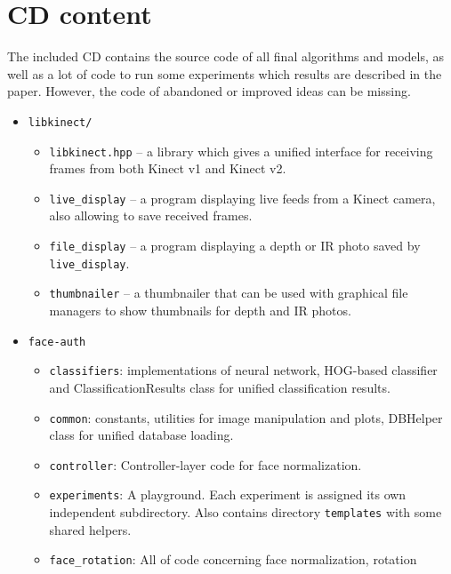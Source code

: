 \chapter{CD content}
    The included CD contains the source code of all final algorithms
    and models, as well as a lot of code to run some experiments
    which results are described in the paper.
    However, the code of abandoned or improved ideas can be missing.

    \begin{itemize}
        \item \texttt{libkinect/}
        \begin{itemize}
            \item \texttt{libkinect.hpp} -- a library which gives a unified interface
            for receiving frames from both Kinect v1 and Kinect v2.
            \item \texttt{live\_display} -- a program displaying live feeds from a Kinect
            camera, also allowing to save received frames.
            \item \texttt{file\_display} -- a program displaying a depth or IR photo saved
            by \texttt{live\_display}.
            \item \texttt{thumbnailer} -- a thumbnailer that can be used with graphical
            file managers to show thumbnails for depth and IR photos.
        \end{itemize}
        \item \texttt{face-auth}
            \begin{itemize}
                \item \texttt{classifiers}: implementations of neural network,
                      HOG-based classifier and ClassificationResults class for
                      unified classification results.
                \item \texttt{common}: constants, utilities for image manipulation and plots,
                      DBHelper class for unified database loading.
                \item \texttt{controller}: Controller-layer code for face normalization.
                \item \texttt{experiments}: A playground. Each experiment is assigned its
                      own independent subdirectory. Also contains directory \texttt{templates}
                      with some shared helpers.
                \item \texttt{face\_rotation}: All of code concerning face normalization, rotation

\end{itemize}
\end{itemize}
